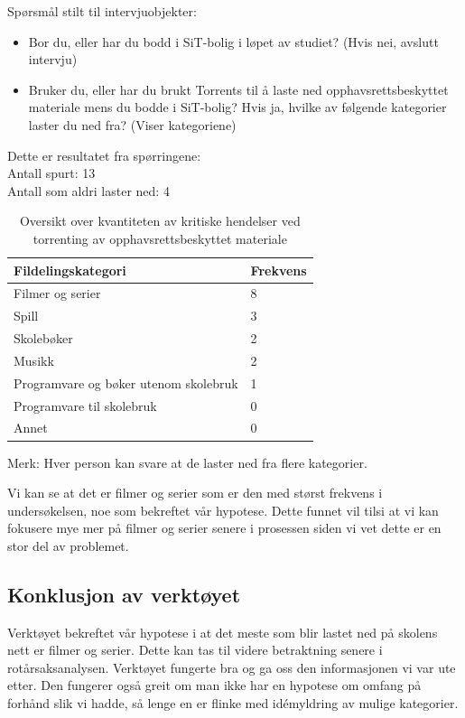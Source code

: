 Spørsmål stilt til intervjuobjekter:
\begin{itemize}
    \item Bor du, eller har du bodd i SiT-bolig i løpet av studiet? (Hvis nei, avslutt intervju)
    \item Bruker du, eller har du brukt Torrents til å laste ned opphavsrettsbeskyttet materiale mens du bodde i SiT-bolig? Hvis ja, hvilke av følgende kategorier laster du ned fra? (Viser kategoriene)
\end{itemize}

\noindent Dette er resultatet fra spørringene: \\
\indent Antall spurt: 13 \\
\indent Antall som aldri laster ned: 4
\begin{table} [H]
    \begin{tabular}{ | m{20em} | m{20em} | }
        \hline
            \cellcolor{yellow} Fildelingskategori & \cellcolor{yellow} Frekvens \\
        \hline
            Filmer og serier & 8  \\
        \hline
            Spill & 3 \\
        \hline
            Skolebøker & 2 \\
        \hline
            Musikk & 2 \\
        \hline
            Programvare og bøker utenom skolebruk & 1 \\
        \hline
            Programvare til skolebruk & 0 \\
        \hline
            Annet & 0 \\
        \hline
    \end{tabular}
    \caption{Oversikt over kvantiteten av kritiske hendelser ved torrenting av opphavsrettsbeskyttet materiale}
    \label{kritisk_tabell_1}
\end{table}

Merk: Hver person kan svare at de laster ned fra flere kategorier.

\noindent Vi kan se at det er filmer og serier som er den med størst frekvens i undersøkelsen, noe som bekreftet vår hypotese. Dette funnet vil tilsi at vi kan fokusere mye mer på filmer og serier senere i prosessen siden vi vet dette er en stor del av problemet. 

\subsection{Konklusjon av verktøyet}
Verktøyet bekreftet vår hypotese i at det meste som blir lastet ned på skolens nett er filmer og serier. Dette kan tas til videre betraktning senere i rotårsaksanalysen. Verktøyet fungerte bra og ga oss den informasjonen vi var ute etter. Den fungerer også greit om man ikke har en hypotese om omfang på forhånd slik vi hadde, så lenge en er flinke med idémyldring av mulige kategorier. 